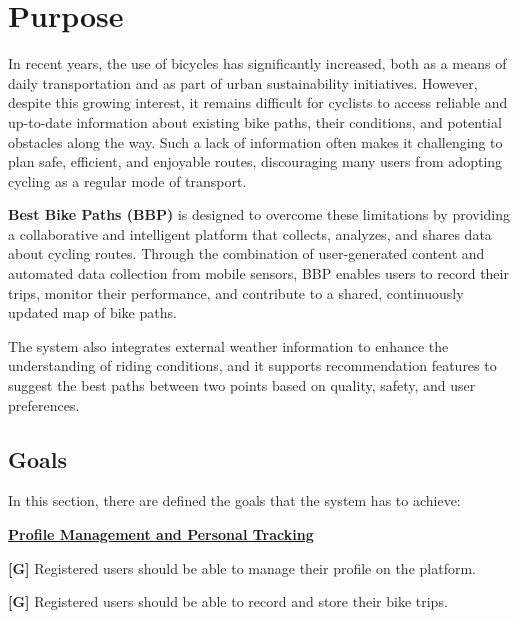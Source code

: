 \section{Purpose}
In recent years, the use of bicycles has significantly increased, both as a means of daily transportation and as part of urban sustainability initiatives.
However, despite this growing interest, it remains difficult for cyclists to access reliable and up-to-date information about existing bike paths, their conditions, and potential obstacles along the way.
Such a lack of information often makes it challenging to plan safe, efficient, and enjoyable routes, discouraging many users from adopting cycling as a regular mode of transport.

\textbf{Best Bike Paths (BBP)} is designed to overcome these limitations by providing a collaborative and intelligent platform that collects, analyzes, and shares data about cycling routes.
Through the combination of user-generated content and automated data collection from mobile sensors, BBP enables users to record their trips, monitor their performance, and contribute to a shared, continuously updated map of bike paths.

The system also integrates external weather information to enhance the understanding of riding conditions, and it supports recommendation features to suggest the best paths between two points based on quality, safety, and user preferences. %

\label{sec:purpose}%

\subsection{Goals}
\label{subsec:goals}%
\setcounter{g}{1}
\newcommand{\cg}{\theg\stepcounter{g}}

\setcounter{subg}{1}
\newcommand{\csubg}{\thesubg\stepcounter{subg}}
\newcommand{\resetsubg}{\setcounter{subg}{1}}
In this section, there are defined the goals that the system has to achieve:

    \uline{\textbf{Profile Management and Personal Tracking}}
    
        \textbf{[G\cg]} Registered users should be able to manage their profile on the platform.

        \textbf{[G\cg]} Registered users should be able to record and store their bike trips.




